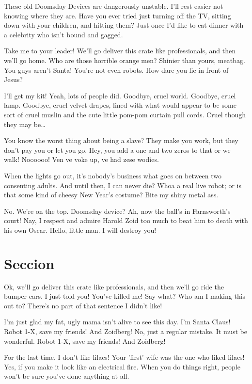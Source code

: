 \documentclass[10pt]{informe_db} %
\begin{document}
These old Doomsday Devices are dangerously unstable. I'll rest easier not knowing where they are. Have you ever tried just turning off the TV, sitting down with your children, and hitting them? Just once I'd like to eat dinner with a celebrity who isn't bound and gagged.

Take me to your leader! We'll go deliver this crate like professionals, and then we'll go home. Who are those horrible orange men? Shinier than yours, meatbag. You guys aren't Santa! You're not even robots. How dare you lie in front of Jesus?

I'll get my kit! Yeah, lots of people did. Goodbye, cruel world. Goodbye, cruel lamp. Goodbye, cruel velvet drapes, lined with what would appear to be some sort of cruel muslin and the cute little pom-pom curtain pull cords. Cruel though they may be…

You know the worst thing about being a slave? They make you work, but they don't pay you or let you go. Hey, you add a one and two zeros to that or we walk! Noooooo! Ven ve voke up, ve had zese wodies.

When the lights go out, it's nobody's business what goes on between two consenting adults. And until then, I can never die? Whoa a real live robot; or is that some kind of cheesy New Year's costume? Bite my shiny metal ass.

No. We're on the top. Doomsday device? Ah, now the ball's in Farnsworth's court! Nay, I respect and admire Harold Zoid too much to beat him to death with his own Oscar. Hello, little man. I will destroy you!



\section{Seccion}
Ok, we'll go deliver this crate like professionals, and then we'll go ride the bumper cars. I just told you! You've killed me! Say what? Who am I making this out to? There's no part of that sentence I didn't like!

I'm just glad my fat, ugly mama isn't alive to see this day. I'm Santa Claus! Robot 1-X, save my friends! And Zoidberg! No, just a regular mistake. It must be wonderful. Robot 1-X, save my friends! And Zoidberg!

For the last time, I don't like lilacs! Your 'first' wife was the one who liked lilacs! Yes, if you make it look like an electrical fire. When you do things right, people won't be sure you've done anything at all.
\end{document}
